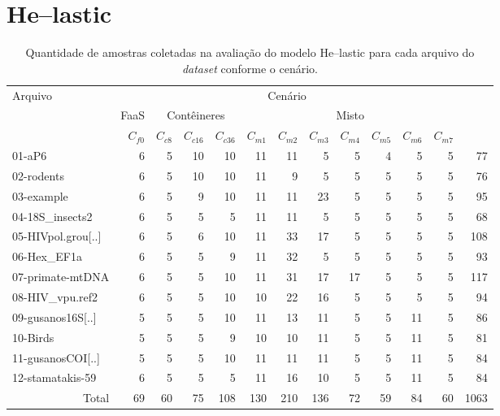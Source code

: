 \documentclass[english,brazilian]{UNISINOSmonografia} %
\newcommand\tabelaAngulo{90}
\begin{document}
\section{\textsf{He}--lastic}


\begin{table}[tbp]
	\centering%
	\begin{minipage}{\textwidth}
		\caption{Quantidade de amostras coletadas na avaliação do modelo \textsf{He}--lastic para cada arquivo do \textit{dataset} conforme o cenário.}
		\label{tab:results-modelo-samples}
		\vspace{1ex}
		\footnotesize
		\begin{tabular*}{\textwidth}{@{\extracolsep{\fill}}lrrrrrrrrrrrr@{}}
			\toprule
			\multirow[b]{3}{*}{Arquivo} & \multicolumn{11}{c}{Cenário} &
			\multirow[b]{3}{*}{\rotatebox[origin=c]{\tabelaAngulo}{\begin{tabular}[c]{@{}c@{}}Total\end{tabular}}} \\ \cmidrule(lr){2-12}
			& \multicolumn{1}{c}{FaaS} & \multicolumn{3}{c}{Contêineres} & \multicolumn{7}{c}{Misto} & \multicolumn{1}{c}{} \\ 
			\cmidrule(lr){2-2}
			\cmidrule(lr){3-5}
			\cmidrule(lr){6-12}
			& $C_{f0}$ & $C_{c8}$ & $C_{c16}$ & $C_{c36}$ & $C_{m1}$ & $C_{m2}$ & $C_{m3}$ & $C_{m4}$ & $C_{m5}$ & $C_{m6}$ & $C_{m7}$ & \multicolumn{1}{c}{} \\
			\midrule
			01-aP6 & 6 & 5 & 10 & 10 & 11 & 11 & 5 & 5 & 4 & 5 & 5 & 77 \\
			02-rodents & 6 & 5 & 10 & 10 & 11 & 9 & 5 & 5 & 5 & 5 & 5 & 76 \\
			03-example & 6 & 5 & 9 & 10 & 11 & 11 & 23 & 5 & 5 & 5 & 5 & 95 \\
			04-18S\_insects2 & 6 & 5 & 5 & 5 & 11 & 11 & 5 & 5 & 5 & 5 & 5 & 68 \\
			05-HIVpol.grou[..] & 6 & 5 & 6 & 10 & 11 & 33 & 17 & 5 & 5 & 5 & 5 & 108 \\
			06-Hex\_EF1a & 6 & 5 & 5 & 9 & 11 & 32 & 5 & 5 & 5 & 5 & 5 & 93 \\
			07-primate-mtDNA & 6 & 5 & 5 & 10 & 11 & 31 & 17 & 17 & 5 & 5 & 5 & 117 \\
			08-HIV\_vpu.ref2 & 6 & 5 & 5 & 10 & 10 & 22 & 16 & 5 & 5 & 5 & 5 & 94 \\
			09-gusanos16S[..] & 5 & 5 & 5 & 10 & 11 & 13 & 11 & 5 & 5 & 11 & 5 & 86 \\
			10-Birds & 5 & 5 & 5 & 9 & 10 & 10 & 11 & 5 & 5 & 11 & 5 & 81 \\
			11-gusanosCOI[..] & 5 & 5 & 5 & 10 & 11 & 11 & 11 & 5 & 5 & 11 & 5 & 84 \\
			12-stamatakis-59 & 6 & 5 & 5 & 5 & 11 & 16 & 10 & 5 & 5 & 11 & 5 & 84 \\
			\bottomrule
			\multicolumn{1}{r}{Total} & 69 & 60 & 75 & 108 & 130 & 210 & 136 & 72 & 59 & 84 & 60 & {\scriptsize 1063} \\ 
		\end{tabular*}
	\end{minipage}
\end{table}
\end{document}
